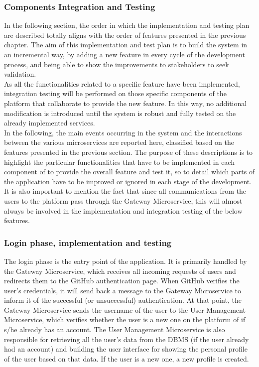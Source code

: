 \subsubsection{Components Integration and Testing}


In the following section, the order in which the implementation and testing plan are described totally aligns with the order of features presented in the previous chapter.
The aim of this implementation and test plan is to build the \app system in an incremental way, by adding a new feature in every cycle of the development process, and being able to show the improvements to stakeholders to seek validation.\\
As all the functionalities related to a specific feature have been implemented, integration testing will be performed on those specific components of the \app platform that collaborate to provide the new feature. In this way, no additional modification is introduced until the system is robust and fully tested on the already implemented services.\\
In the following, the main events occurring in the system and the interactions between the various microservices are reported here, classified based on the features presented in the previous section. The purpose of these descriptions is to highlight the particular functionalities that have to be implemented in each component of \app to provide the overall feature and test it, so to detail which parts of the application have to be improved or ignored in each stage of the development.\\
It is also important to mention the fact that since all communications from the users to the \app platform pass through the Gateway Microservice, this will almost always be involved in the implementation and integration testing of the below features.


\vspace{0.7cm}

\subsubsection*{Login phase, implementation and testing}

The login phase is the entry point of the application. It is primarily handled by the Gateway Microservice, which receives all incoming requests of users and redirects them to the GitHub authentication page. When GitHub verifies the user's credentials, it will send back a message to the Gateway Microservice to inform it of the successful (or unsuccessful) authentication. At that point, the Gateway Microservice sends the username of the user to the User Management Microservice, which verifies whether the user is a new one on the platform of if s/he already has an account. 
The User Management Microservice is also responsible for retrieving all the user's data from the DBMS (if the user already had an account) and building the user interface for showing the personal profile of the user based on that data. If the user is a new one, a new profile is created.

